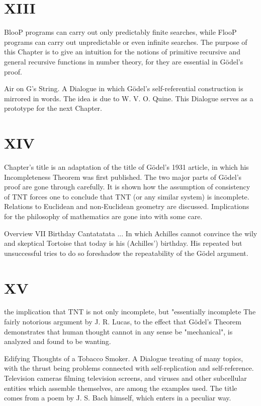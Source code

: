\chapter {XIII}
BlooP programs can carry out only predictably finite searches, while FlooP programs can carry out unpredictable or even infinite searches. The purpose of this Chapter is to give an intuition for the notions of primitive recursive and general recursive functions in number theory, for they are essential in Gödel’s proof. 

Air on G's String. A Dialogue in which Gödel’s self-referential construction is mirrored in words. The idea is due to W. V. O. Quine. This Dialogue serves as a prototype for the next Chapter. 


\chapter {XIV}
Chapter's title is an adaptation of the title of Gödel’s 1931 article, in which his Incompleteness Theorem was first published. The two major parts of Gödel’s proof are gone through carefully. It is shown how the assumption of consistency of TNT forces one to conclude that TNT (or any similar system) is incomplete. Relations to Euclidean and non-Euclidean geometry are discussed. Implications for the philosophy of mathematics are gone into with some care. 







Overview                                                                                       VII Birthday Cantatatata ... In which Achilles cannot convince the wily and skeptical Tortoise that today is his (Achilles') birthday. His repeated but unsuccessful tries to do so foreshadow the repeatability of the Gödel argument. 


\chapter {XV}
the implication that TNT is not only incomplete, but "essentially incomplete The fairly notorious argument by J. R. Lucas, to the effect that Gödel’s Theorem demonstrates that human thought cannot in any sense be "mechanical", is analyzed and found to be wanting. 

Edifying Thoughts of a Tobacco Smoker. A Dialogue treating of many topics, with the thrust being problems connected with self-replication and self-reference. Television cameras filming television screens, and viruses and other subcellular entities which assemble themselves, are among the examples used. The title comes from a poem by J. S. Bach himself, which enters in a peculiar way. 


